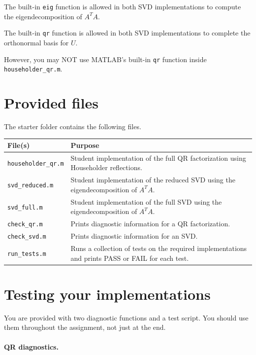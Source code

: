 \documentclass{ximera}
\begin{document}
The built-in \texttt{eig} function is allowed in both SVD
implementations to compute the eigendecomposition of $A^TA$.

The built-in \texttt{qr} function is allowed in both SVD
implementations to complete the orthonormal basis for $U$.

However, you may NOT use MATLAB's built-in \texttt{qr}
function inside \texttt{householder\_qr.m}.

\section*{Provided files}

The starter folder contains the following files.

\begin{center}
\begin{tabular}{|p{4cm}|p{9cm}|}
\hline
File(s) & Purpose\\
\hline
\texttt{householder\_qr.m} &
Student implementation of the full QR factorization using
Householder reflections.\\
\hline
\texttt{svd\_reduced.m} &
Student implementation of the reduced SVD using the eigendecomposition
of $A^TA$.\\
\hline
\texttt{svd\_full.m} &
Student implementation of the full SVD using the eigendecomposition
of $A^TA$.\\
\hline
\texttt{check\_qr.m} &
Prints diagnostic information for a QR factorization.\\
\hline
\texttt{check\_svd.m} &
Prints diagnostic information for an SVD.\\
\hline
\texttt{run\_tests.m} &
Runs a collection of tests on the required implementations and
prints PASS or FAIL for each test.\\
\hline
\end{tabular}
\end{center}

\section*{Testing your implementations}

You are provided with two diagnostic functions and a test script.
You should use them throughout the assignment, not just at the end.

\paragraph{QR diagnostics.}
\end{document}

